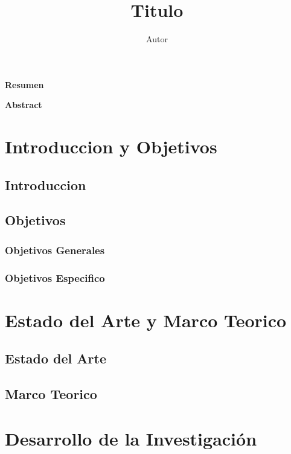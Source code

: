 \documentclass[12pt,a4paper]{article}
\author{Autor}
\title{Titulo}
\begin{document}
\nocite{*}

\tableofcontents
\newpage
{}
\begin{flushleft}
\large\textbf{Resumen}
\end{flushleft}
\begin{flushleft}
\large\textbf{Abstract}
\end{flushleft}

\section{Introduccion y Objetivos}
\subsection{Introduccion}
\subsection{Objetivos}
\subsubsection{Objetivos Generales}
\subsubsection{Objetivos Especifico}
\section{ Estado del Arte y Marco Teorico}
\subsection{Estado del Arte}
\subsection{Marco Teorico}
\section{Desarrollo de la Investigación}
\end{document}
